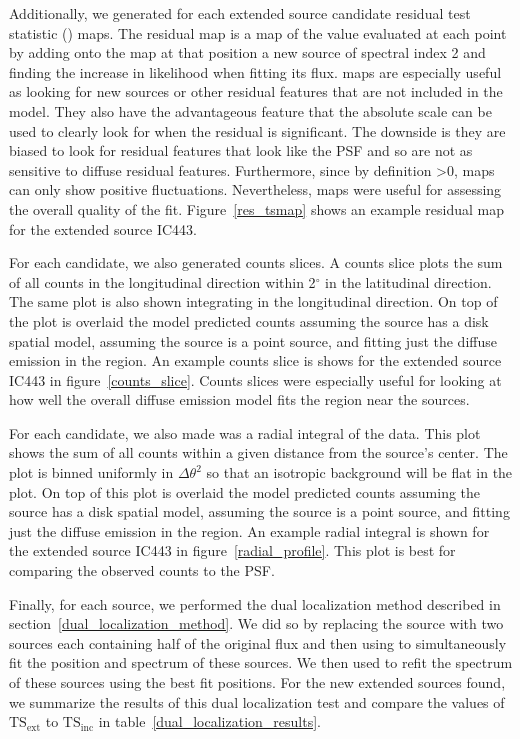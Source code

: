 \documentclass[12pt,preprint]{aastex}
\newcommand{\tsext}{{\ensuremath{\text{TS}_\text{ext}}}\xspace}
\newcommand{\tsinc}{\ensuremath{\text{TS}_\text{inc}}\xspace}
\newcommand{\ts}{\text{TS}\xspace}
\renewcommand{\deg}{\ensuremath{^\circ}\xspace}
\newcommand{\pointlike}{\text{\em pointlike}\xspace}
\newcommand{\gtlike}{\text{\em gtlike}\xspace}
\begin{document}
Additionally,
we generated for each extended source candidate residual
test statistic (\ts) maps.  The residual \ts map is a map of the \ts
value evaluated at each point by adding onto the map at that position
a new source of spectral index 2 and finding the increase in likelihood
when fitting its flux. \ts maps are especially useful as looking for
new sources or other residual features that are not included in the
model. They also have the advantageous feature that the absolute scale
can be used to clearly look for when the residual is significant.
The downside is they are biased to look for residual features
that look like the PSF and so are not as sensitive to diffuse residual
features. Furthermore, since by definition \ts>0, \ts maps can only show
positive fluctuations. Nevertheless, \ts maps were useful for
assessing the overall quality of the fit. Figure~\ref{res_tsmap}
shows an example residual \ts map for the extended source IC443.


For each candidate, we also generated counts slices. A counts slice
plots the sum of all counts in the longitudinal direction within 2\deg in
the latitudinal direction.  The same plot is also shown integrating in
the longitudinal direction.  On top of the plot is overlaid the model
predicted counts assuming the source has a disk spatial model, assuming
the source is a point source, and fitting just the diffuse emission in
the region.  An example counts slice is shows for the extended source
IC443 in figure~\ref{counts_slice}. Counts slices were especially useful
for looking at how well the overall diffuse emission model fits the region
near the sources.

For each candidate, we also made was a radial integral of the data. This
plot shows the sum of all counts within a given distance from the
source's center. The plot is binned uniformly in $\Delta \theta^2$ so
that an isotropic background will be flat in the plot. On top of this
plot is overlaid the model predicted counts assuming the source has a
disk spatial model, assuming the source is a point source, and fitting
just the diffuse emission in the region. An example radial integral
is shown for the extended source IC443 in figure~\ref{radial_profile}.
This plot is best for comparing the observed counts to the PSF.

Finally, for each source, we performed the dual localization method
described in section~\ref{dual_localization_method}.  We 
did so by replacing the source with two sources each containing
half of the original flux and then using \pointlike to
simultaneously fit the position and spectrum of these sources.
We then used \gtlike to refit the spectrum of these
sources using the best fit positions. For the
new extended sources found, we summarize the results of
this dual localization test and compare the values of \tsext
to \tsinc in table~\ref{dual_localization_results}.
\end{document}
